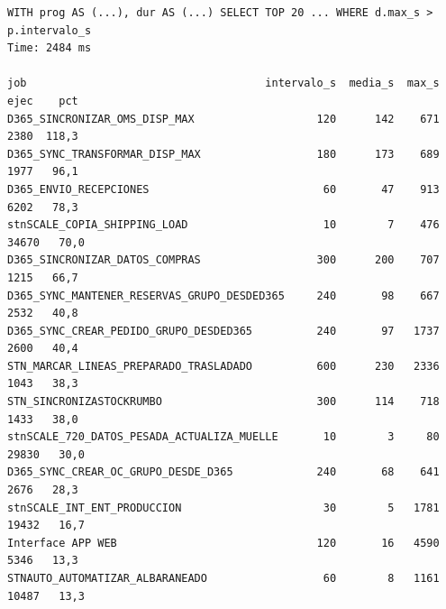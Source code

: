 \documentclass[11pt,a4paper]{article}
\begin{document}
\begin{lstlisting}[style=salida]
WITH prog AS (...), dur AS (...) SELECT TOP 20 ... WHERE d.max_s > p.intervalo_s
Time: 2484 ms

job                                     intervalo_s  media_s  max_s  ejec    pct
D365_SINCRONIZAR_OMS_DISP_MAX                   120      142    671   2380  118,3
D365_SYNC_TRANSFORMAR_DISP_MAX                  180      173    689   1977   96,1
D365_ENVIO_RECEPCIONES                           60       47    913   6202   78,3
stnSCALE_COPIA_SHIPPING_LOAD                     10        7    476  34670   70,0
D365_SINCRONIZAR_DATOS_COMPRAS                  300      200    707   1215   66,7
D365_SYNC_MANTENER_RESERVAS_GRUPO_DESDED365     240       98    667   2532   40,8
D365_SYNC_CREAR_PEDIDO_GRUPO_DESDED365          240       97   1737   2600   40,4
STN_MARCAR_LINEAS_PREPARADO_TRASLADADO          600      230   2336   1043   38,3
STN_SINCRONIZASTOCKRUMBO                        300      114    718   1433   38,0
stnSCALE_720_DATOS_PESADA_ACTUALIZA_MUELLE       10        3     80  29830   30,0
D365_SYNC_CREAR_OC_GRUPO_DESDE_D365             240       68    641   2676   28,3
stnSCALE_INT_ENT_PRODUCCION                      30        5   1781  19432   16,7
Interface APP WEB                               120       16   4590   5346   13,3
STNAUTO_AUTOMATIZAR_ALBARANEADO                  60        8   1161  10487   13,3
\end{lstlisting}
\end{document}
